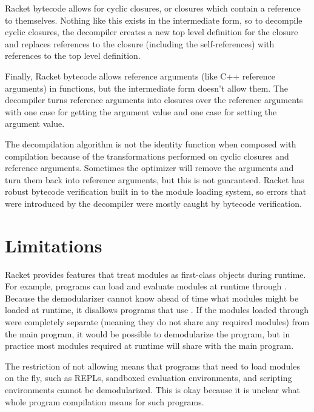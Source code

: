 Racket bytecode allows for cyclic closures, or closures which contain a reference to themselves.
Nothing like this exists in the intermediate form, so to decompile cyclic closures, the decompiler creates a new top level definition for the closure and replaces references to the closure (including the self-references) with references to the top level definition.

Finally, Racket bytecode allows reference arguments (like C++ reference arguments) in functions, but the intermediate form doesn't allow them.
The decompiler turns reference arguments into  closures over the reference arguments with one case for getting the argument value and one case for setting the argument value. 

The decompilation algorithm is not the identity function when composed with compilation because of the transformations performed on cyclic closures and reference arguments.
Sometimes the optimizer will remove the  arguments and turn them back into reference arguments, but this is not guaranteed. 
Racket has robust bytecode verification built in to the module loading system, so errors that were introduced by the decompiler were mostly caught by bytecode verification.

\section{Limitations}

Racket provides features that treat modules as first-class objects during runtime. 
For example, programs can load and evaluate modules at runtime through . 
Because the demodularizer cannot know ahead of time what modules might be loaded at runtime, it disallows programs that use .
If the modules loaded through  were completely separate (meaning they do not share any required modules) from the main program, it would be possible to demodularize the program, but in practice most modules required at runtime will share with the main program.

The restriction of not allowing  means that programs that need to load modules on the fly, such as REPLs, sandboxed evaluation environments, and scripting environments cannot be demodularized.
This is okay because it is unclear what whole program compilation means for such programs.

